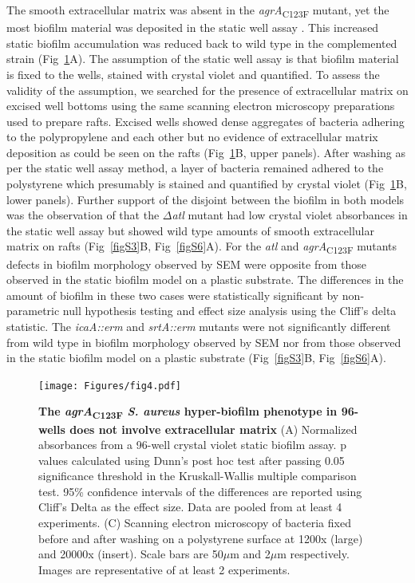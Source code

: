 \documentclass[10pt,letterpaper]{article}
\begin{document}
The smooth extracellular matrix was absent in the \textit{agrA}\textsubscript{C123F} mutant, yet the most biofilm material was deposited in the static well assay .
This increased static biofilm accumulation was reduced back to wild type in the complemented strain (Fig~\ref{fig4}A).
The assumption of the static well assay is that biofilm material is fixed to the wells, stained with crystal violet and quantified.
To assess the validity of the assumption, we searched for the presence of extracellular matrix on excised well bottoms using the same scanning electron microscopy preparations used to prepare rafts.
Excised wells showed dense aggregates of bacteria adhering to the polypropylene and each other but no evidence of extracellular matrix deposition as could be seen on the rafts (Fig~\ref{fig4}B, upper panels).
After washing as per the static well assay method, a layer of bacteria remained adhered to the polystyrene which presumably is stained and quantified by crystal violet (Fig~\ref{fig4}B, lower panels).
Further support of the disjoint between the biofilm in both models was the observation of that the $\Delta$\textit{atl} mutant had low crystal violet absorbances in the static well assay but showed wild type amounts of smooth extracellular matrix on rafts (Fig~\ref{figS3}B, Fig~\ref{figS6}A).
For the \textit{atl} and \textit{agrA}\textsubscript{C123F} mutants defects in biofilm morphology observed by SEM were opposite from those observed in the static biofilm model on a plastic substrate.
The differences in the amount of biofilm in these two cases were statistically significant by non-parametric null hypothesis testing and effect size analysis using the Cliff's delta statistic.
The \textit{icaA::erm} and \textit{srtA::erm} mutants were not significantly different from wild type in biofilm morphology observed by SEM nor from those observed in the static biofilm model on a plastic substrate (Fig~\ref{figS3}B, Fig~\ref{figS6}A).


\begin{figure}[!ht]
\begin{adjustwidth}{-2.25in}{0in}
\texttt{[image: Figures/fig4.pdf]}
\caption[The \textit{agrA}\textsubscript{C123F} \textit{S. aureus} hyper-biofilm phenotype in 96-wells does not involve extracellular matrix]{
	\textbf{The \textit{agrA}\textsubscript{C123F} \textit{S. aureus} hyper-biofilm phenotype in 96-wells does not involve extracellular matrix}
	(A) Normalized absorbances from a 96-well crystal violet static biofilm assay. p values calculated using Dunn's post hoc test after passing 0.05 significance threshold in the Kruskall-Wallis multiple comparison test. 95\% confidence intervals of the differences are reported using Cliff's Delta as the effect size. Data are pooled from at least 4 experiments.
	(C) Scanning electron microscopy of bacteria fixed before and after washing on a polystyrene surface at 1200x (large) and 20000x (insert). Scale bars are 50$\mu$m and 2$\mu$m respectively. Images are representative of at least 2 experiments.}
    \label{fig4}
    \end{adjustwidth}
\end{figure}
\end{document}
